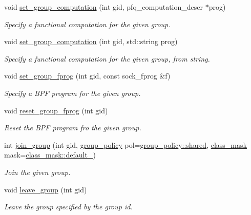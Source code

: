 \begin{DoxyCompactItemize}
void \hyperlink{classpfq_1_1socket_acd2ef781a82b49566f03a085ba091138}{set\+\_\+group\+\_\+computation} (int gid, pfq\+\_\+computation\+\_\+descr $\ast$prog)
\begin{DoxyCompactList}\small\item\em Specify a functional computation for the given group. \end{DoxyCompactList}\item 
void \hyperlink{classpfq_1_1socket_a968ae9e3375650990488dcb1784a4bd1}{set\+\_\+group\+\_\+computation} (int gid, std\+::string prog)
\begin{DoxyCompactList}\small\item\em Specify a functional computation for the given group, from string. \end{DoxyCompactList}\item 
void \hyperlink{classpfq_1_1socket_ad618894910a12a08eaed3d8668db25af}{set\+\_\+group\+\_\+fprog} (int gid, const sock\+\_\+fprog \&f)
\begin{DoxyCompactList}\small\item\em Specify a B\+P\+F program for the given group. \end{DoxyCompactList}\item 
void \hyperlink{classpfq_1_1socket_a2327e71a6f94e54efb0da5ec36b1c620}{reset\+\_\+group\+\_\+fprog} (int gid)
\begin{DoxyCompactList}\small\item\em Reset the B\+P\+F program fro the given group. \end{DoxyCompactList}\item 
int \hyperlink{classpfq_1_1socket_afbd75341794fae964ed23ce5858fd153}{join\+\_\+group} (int gid, \hyperlink{namespacepfq_ac41249c8510558905b01fa4d866a38d7}{group\+\_\+policy} pol=\hyperlink{namespacepfq_ac41249c8510558905b01fa4d866a38d7a9e81e7b963c71363e2fb3eefcfecfc0e}{group\+\_\+policy\+::shared}, \hyperlink{namespacepfq_a96af1f5ed530eff563eb917516758fbb}{class\+\_\+mask} mask=\hyperlink{namespacepfq_a96af1f5ed530eff563eb917516758fbba172b03053216c6158fe380805998ad6c}{class\+\_\+mask\+::default\+\_\+})
\begin{DoxyCompactList}\small\item\em Join the given group. \end{DoxyCompactList}\item 
void \hyperlink{classpfq_1_1socket_ac512d6b89db52da73a51ba9112658180}{leave\+\_\+group} (int gid)
\begin{DoxyCompactList}\small\item\em Leave the group specified by the group id. \end{DoxyCompactList}\item 

\end{DoxyCompactItemize}
